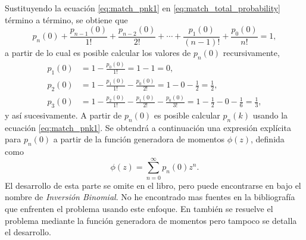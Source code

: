 \documentclass[a4paper]{report}
\begin{document}
Sustituyendo la ecuación \ref{eq:match_pnk1} en \ref{eq:match_total_probability} término a término, se obtiene que
\begin{equation}\label{eq:match_pn0_sucesion}
 p_n(0)+\frac{p_{n-1}(0)}{1!}+\frac{p_{n-2}(0)}{2!}+\cdots+\frac{p_{1}(0)}{(n-1)!}+\frac{p_0(0)}{n!}=1,
\end{equation}
a partir de lo cual es posible calcular los valores de \(p_n(0)\) recursivamente,
\begin{align*}
 p_1(0)&=1-\frac{p_0(0)}{1!}=1-1=0,\\
 p_2(0)&=1-\frac{p_1(0)}{1!}-\frac{p_0(0)}{2!}=1-0-\frac{1}{2}=\frac{1}{2},\\
 p_3(0)&=1-\frac{p_2(0)}{1!}-\frac{p_1(0)}{2!}-\frac{p_0(0)}{3!}=1-\frac{1}{2}-0-\frac{1}{6}=\frac{1}{3},
\end{align*}
y así sucesivamente. A partir de \(p_n(0)\) es posible calcular \(p_n(k)\) usando la ecuación \ref{eq:match_pnk1}. Se obtendrá a continuación una expresión explícita para \(p_n(0)\) a partir de la función generadora de momentos \(\phi(z)\), definida como
\begin{equation}\label{eq:generating_moments_function}
 \phi(z)=\sum_{n=0}^{\infty}p_n(0)z^n.
\end{equation}
El desarrollo de esta parte se omite en el libro, pero puede encontrarse en \cite{hathout2003old} bajo el nombre de \emph{Inversión Binomial}. No he encontrado mas fuentes en la bibliografía que enfrenten el problema usando este enfoque. En \cite{takacs1980problem} también se resuelve el problema mediante la función generadora de momentos pero tampoco se detalla el desarrollo.
\end{document}
